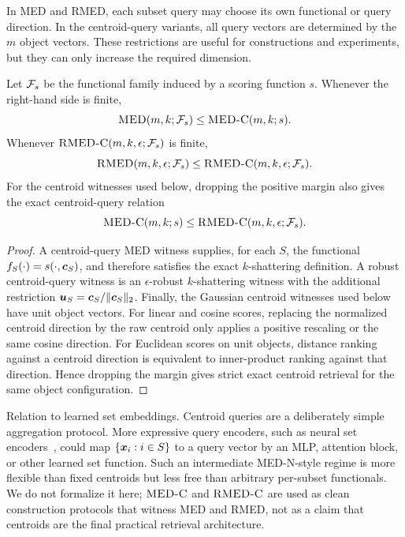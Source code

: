 \documentclass{article}
\begin{document}
In MED and RMED, each subset query may choose its own functional or query direction. In the centroid-query variants, all query vectors are determined by the $m$ object vectors. These restrictions are useful for constructions and experiments, but they can only increase the required dimension.
\begin{proposition}\label{prop:centroid-witnesses}
    Let $\mathcal{F}_s$ be the functional family induced by a scoring function $s$. Whenever the right-hand side is finite,
    \[
        \textsc{MED}(m,k;\mathcal{F}_s)\leq \textsc{MED-C}(m,k;s).
    \]
    Whenever $\textsc{RMED-C}(m,k,\epsilon;\mathcal{F}_s)$ is finite,
    \[
        \textsc{RMED}(m,k,\epsilon;\mathcal{F}_s)
        \leq
        \textsc{RMED-C}(m,k,\epsilon;\mathcal{F}_s).
    \]
    For the centroid witnesses used below, dropping the positive margin also gives the exact centroid-query relation
    \[
        \textsc{MED-C}(m,k;s)
        \leq
        \textsc{RMED-C}(m,k,\epsilon;\mathcal{F}_s).
    \]
\end{proposition}
\begin{proof}
    A centroid-query MED witness supplies, for each $S$, the functional $f_S(\cdot)=s(\cdot,\bm{c}_S)$, and therefore satisfies the exact $k$-shattering definition. A robust centroid-query witness is an $\epsilon$-robust $k$-shattering witness with the additional restriction $\bm{u}_S=\bm{c}_S/\|\bm{c}_S\|_2$. Finally, the Gaussian centroid witnesses used below have unit object vectors. For linear and cosine scores, replacing the normalized centroid direction by the raw centroid only applies a positive rescaling or the same cosine direction. For Euclidean scores on unit objects, distance ranking against a centroid direction is equivalent to inner-product ranking against that direction. Hence dropping the margin gives strict exact centroid retrieval for the same object configuration.
\end{proof}

Relation to learned set embeddings. Centroid queries are a deliberately
simple aggregation protocol. More expressive query encoders, such as
neural set encoders~\citep{zaheer2017deep}, could map
$\{\bm{x}_i:i\in S\}$ to a query vector by an MLP, attention block, or
other learned set function. Such an intermediate MED-N-style regime is
more flexible than fixed centroids but less free than arbitrary
per-subset functionals. We do not formalize it here; $\textsc{MED-C}$ and
$\textsc{RMED-C}$ are used as clean construction protocols that witness MED and
RMED, not as a claim that centroids are the final practical retrieval
architecture.
\end{document}
